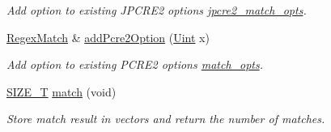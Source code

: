\begin{DoxyCompactItemize}
\begin{DoxyCompactList}\small\item\em Add option to existing J\+P\+C\+R\+E2 options \hyperlink{classjpcre2_1_1RegexMatch_a70d62df887eeed237724f64fbc378700}{jpcre2\+\_\+match\+\_\+opts}. \end{DoxyCompactList}\item 
\hyperlink{classjpcre2_1_1RegexMatch}{Regex\+Match} \& \hyperlink{classjpcre2_1_1RegexMatch_aac4857cd8f5eae15b29b9afbe9023522_aac4857cd8f5eae15b29b9afbe9023522}{add\+Pcre2\+Option} (\hyperlink{namespacejpcre2_a078242d38221a13fb3543b9edd78c099}{Uint} x)
\begin{DoxyCompactList}\small\item\em Add option to existing P\+C\+R\+E2 options \hyperlink{classjpcre2_1_1RegexMatch_a697d5731007350b0f20d2018fcfafa90}{match\+\_\+opts}. \end{DoxyCompactList}\item 
\hyperlink{namespacejpcre2_a2aac465ddcb123560c7c8215dd69246c}{S\+I\+Z\+E\+\_\+T} \hyperlink{classjpcre2_1_1RegexMatch_a5868aef3a146594ea1ebef34d122bb33_a5868aef3a146594ea1ebef34d122bb33}{match} (void)
\begin{DoxyCompactList}\small\item\em Store match result in vectors and return the number of matches. \end{DoxyCompactList}\end{DoxyCompactItemize}
